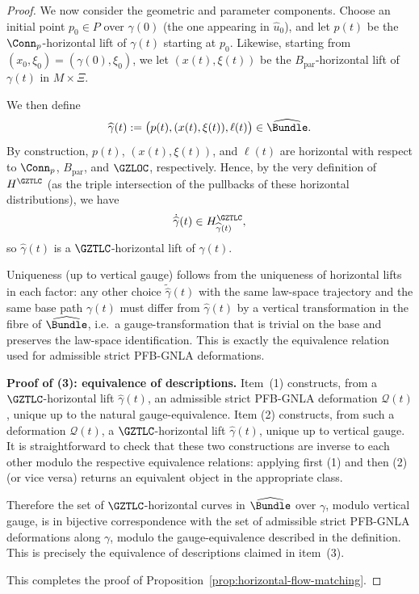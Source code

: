 \documentclass[11pt]{book}
\theoremstyle{plain}
\theoremstyle{definition}
\begin{document}
\begin{proof}
We now consider the geometric and parameter components.  Choose an
initial point \(p_0\in P\) over \(\gamma(0)\) (the one appearing in
\(\widehat{u}_0\)), and let \(p(t)\) be the \(\Conn_p\)-horizontal
lift of \(\gamma(t)\) starting at \(p_0\).  Likewise, starting from
\((x_0,\xi_0)=(\gamma(0),\xi_0)\), we let \((x(t),\xi(t))\) be the
\(B_{\mathrm{par}}\)-horizontal lift of \(\gamma(t)\) in
\(M\times\Xi\).

We then define
\[
  \widehat{\gamma}(t)
  :=
  \bigl(p(t),(x(t),\xi(t)),\ell(t)\bigr)\in\widehat{\Bundle}.
\]
By construction, \(p(t)\), \((x(t),\xi(t))\), and \(\ell(t)\) are
horizontal with respect to \(\Conn_p\), \(B_{\mathrm{par}}\), and
\(\GZLOC\), respectively.  Hence, by the very definition of
\(H^{\GZTLC}\) (as the triple intersection of the pullbacks of these
horizontal distributions), we have
\[
  \dot{\widehat{\gamma}}(t)\in
  H^{\GZTLC}_{\widehat{\gamma}(t)},
\]
so \(\widehat{\gamma}(t)\) is a \(\GZTLC\)-horizontal lift of
\(\gamma(t)\).

Uniqueness (up to vertical gauge) follows from the uniqueness of
horizontal lifts in each factor: any other choice
\(\widetilde{\widehat{\gamma}}(t)\) with the same law-space trajectory
and the same base path \(\gamma(t)\) must differ from
\(\widehat{\gamma}(t)\) by a vertical transformation in the fibre of
\(\widehat{\Bundle}\), i.e.\ a gauge-transformation that is trivial on
the base and preserves the law-space identification.  This is exactly
the equivalence relation used for admissible strict PFB-GNLA
deformations.



\medskip\noindent
\textbf{Proof of (3): equivalence of descriptions.}
Item~(1) constructs, from a \(\GZTLC\)-horizontal lift
\(\widehat{\gamma}(t)\), an admissible strict PFB-GNLA deformation
\(\mathcal{Q}(t)\), unique up to the natural gauge-equivalence.  Item
(2) constructs, from such a deformation \(\mathcal{Q}(t)\), a
\(\GZTLC\)-horizontal lift \(\widehat{\gamma}(t)\), unique up to
vertical gauge.  It is straightforward to check that these two
constructions are inverse to each other modulo the respective
equivalence relations: applying first (1) and then (2) (or vice versa)
returns an equivalent object in the appropriate class.

Therefore the set of \(\GZTLC\)-horizontal curves in
\(\widehat{\Bundle}\) over \(\gamma\), modulo vertical gauge, is in
bijective correspondence with the set of admissible strict PFB-GNLA
deformations along \(\gamma\), modulo the gauge-equivalence described
in the definition.  This is precisely the equivalence of descriptions
claimed in item~(3).



\medskip
This completes the proof of
Proposition~\ref{prop:horizontal-flow-matching}.
\end{proof}
\end{document}
